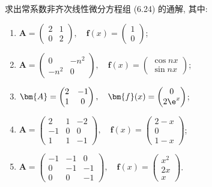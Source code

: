 \begin{exercise}
  求出常系数非齐次线性微分方程组 (6.24) 的通解, 其中:
  \begin{enumerate}[(1)]
  \item $\bm{A}=\begin{pmatrix}2&1\\0&2\end{pmatrix},
    \quad\bm{f}(x)=\begin{pmatrix}1\\0\end{pmatrix}$;
  \item $\bm{A}=\begin{pmatrix}0&-n^2\\-n^2&0\end{pmatrix},
    \quad\bm{f}(x)=\begin{pmatrix}\cos nx\\\sin nx\end{pmatrix}$;
  \item $\bm{A}=\begin{pmatrix}2&-1\\1&0\end{pmatrix},
    \quad\bm{f}(x)=\begin{pmatrix}0\\2\e^x\end{pmatrix}$;
  \item $\bm{A}=\begin{pmatrix}2&1&-2\\-1&0&0\\1&1&-1\end{pmatrix},
    \quad\bm{f}(x)=\begin{pmatrix}2-x\\0\\1-x\end{pmatrix}$;
  \item $\bm{A}=\begin{pmatrix}-1&-1&0\\0&-1&-1\\0&0&-1\end{pmatrix},
    \quad\bm{f}(x)=\begin{pmatrix}x^2\\2x\\x\end{pmatrix}$.
  \end{enumerate}
\end{exercise}

